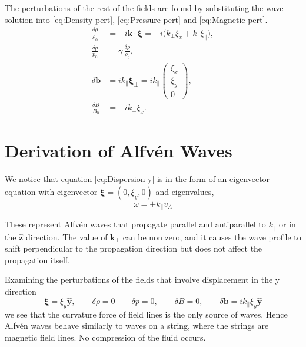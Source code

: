 The perturbations of the rest of the fields are found by substituting the wave solution into \eqref{eq:Density pert}, \eqref{eq:Pressure pert} and \eqref{eq:Magnetic pert}.
\begin{equation}
    \begin{aligned}
     \frac{\delta\rho}{\rho_{0}} &= -i\boldsymbol{k}\cdot\boldsymbol{\xi} = -i\bigl(k_{\perp}\xi_{x} + k_{\parallel}\xi_{\parallel}\bigr), \\
        \frac{\delta p}{p_{0}} &= \gamma\,\frac{\delta\rho}{\rho_{0}}, \\
        \delta\boldsymbol{b} &= i k_{\parallel}\boldsymbol{\xi}_{\perp} = i k_{\parallel}
        \begin{pmatrix}
            \xi_{x} \\
            \xi_{y} \\
            0
        \end{pmatrix}, \\
        \frac{\delta B}{B_{0}} &= -i k_{\perp}\xi_{x}.
    \label{eq:perturbations of fields} 
    \end{aligned}
\end{equation}

\section{Derivation of Alfv\'en Waves}
We notice that equation \eqref{eq:Dispersion y} is in the form of an eigenvector equation with eigenvector \(\boldsymbol{\xi}=(0,\xi_y,0)\) and eigenvalues,
\begin{equation*}
    \omega=\pm k_{\parallel}v_A
\end{equation*}

These represent Alfv\'en waves that propagate parallel and antiparallel to \(k_{\parallel}\) or in the \(\hat{\boldsymbol{z}}\) direction. The value of \(\boldsymbol{k_{\perp}}\) can be non zero, and it causes the wave profile to shift perpendicular to the propagation direction but does not affect the propagation itself.

Examining the perturbations of the fields that involve displacement in the y direction  
\begin{equation*}
    \boldsymbol{\xi}= \xi_y \hat{\boldsymbol{y}}, \qquad \delta\rho=0 \qquad \delta p=0, \qquad \delta B=0, \qquad \delta\boldsymbol{b}= ik_{\parallel} \xi_y \hat{\boldsymbol{y}}
\end{equation*}
we see that the curvature force of field lines is the only source of waves. Hence Alfv\'en waves behave similarly to waves on a string, where the strings are magnetic field lines. No compression of the fluid occurs.

